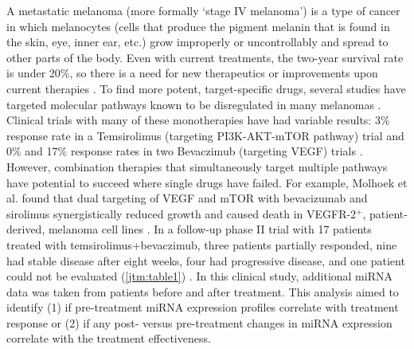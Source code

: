 A metastatic melanoma (more formally `stage IV melanoma') is a type of cancer
in which melanocytes (cells that produce the pigment melanin that is found in
the skin, eye, inner ear, etc.) grow improperly or uncontrollably 
and spread to other parts of the
body. Even with current treatments, the two-year survival rate is 
under 20\%, so there is a need for new therapeutics
or improvements upon current therapies \cite{Robert:2011vp,Hodi:2010wt}.
To find more potent, target-specific drugs, several studies have targeted
molecular pathways known to be disregulated in many melanomas \cite{Ko:2011dk}.
Clinical trials with many of these monotherapies have had variable results:
3\% response rate in a Temsirolimus (targeting PI3K-AKT-mTOR pathway) 
trial and 0\% and 17\% response rates in two Bevaczimub (targeting VEGF)
trials \cite{Margolin:2004vl,Varker:2007dj,Schuster:2012fo}.
However, combination therapies that simultaneously target multiple
pathways have potential to succeed where single drugs have failed.
For example, Molhoek et al. found that dual targeting of VEGF and mTOR
with bevacizumab and sirolimus synergistically reduced growth
and caused death in VEGFR-2$^{+}$, patient-derived, melanoma cell lines \cite{Molhoek:2008jx}.
In a follow-up phase II trial with 17 patients treated with temsirolimus+bevaczimub,
three patients partially responded, nine had stable disease after eight weeks,
four had progressive disease, and one patient could not be 
evaluated (\autoref{jtm:table1}) \cite{Slingluff:2013ej}. In this clinical study, additional miRNA data
was taken from patients before and after treatment. This analysis aimed to 
identify (1) if pre-treatment miRNA expression profiles 
correlate with treatment response or (2) if any post- versus pre-treatment
changes in miRNA expression correlate with the treatment effectiveness.


